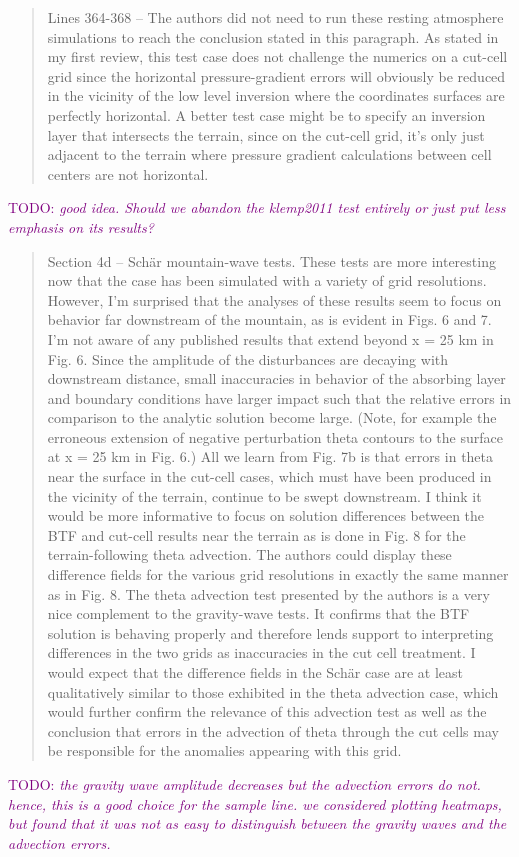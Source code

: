 \documentclass{article}
\newcommand{\TODO}[1]{\textcolor{purple}{TODO: \emph{#1}}}
\begin{document}
\begin{quotation}
 Lines 364-368 – The authors did not need to run these resting atmosphere 
 simulations to reach the conclusion stated in this paragraph. As stated in my first 
 review, this test case does not challenge the numerics on a cut-cell grid since the horizontal pressure-gradient errors will obviously be reduced in the vicinity of the 
 low level inversion where the coordinates surfaces are perfectly horizontal. A better 
 test case might be to specify an inversion layer that intersects the terrain, since on 
 the cut-cell grid, it's only just adjacent to the terrain where pressure gradient 
 calculations between cell centers are not horizontal.   
\end{quotation}
\TODO{good idea.  Should we abandon the klemp2011 test entirely or just put less emphasis on its results?}

\begin{quotation}
	Section 4d – Sch\"{a}r mountain-wave tests. These tests are more interesting now that 
 the case has been simulated with a variety of grid resolutions. However, I'm 
 surprised that the analyses of these results seem to focus on behavior far 
 downstream of the mountain, as is evident in Figs. 6 and 7. I'm not aware of any 
 published results that extend beyond x = 25 km in Fig. 6. Since the amplitude of the 
 disturbances are decaying with downstream distance, small inaccuracies in behavior 
 of the absorbing layer and boundary conditions have larger impact such that the 
 relative errors in comparison to the analytic solution become large. (Note, for 
 example the erroneous extension of negative perturbation theta contours to the 
 surface at x = 25 km in Fig. 6.)  All we learn from Fig. 7b is that errors in theta near 
 the surface in the cut-cell cases, which must have been produced in the vicinity of the 
 terrain, continue to be swept downstream. I think it would be more informative to 
 focus on solution differences between the BTF and cut-cell results near the terrain as 
 is done in Fig. 8 for the terrain-following theta advection. The authors could display 
 these difference fields for the various grid resolutions in exactly the same manner as 
 in Fig. 8. The theta advection test presented by the authors is a very nice complement 
 to the gravity-wave tests. It confirms that the BTF solution is behaving properly and 
 therefore lends support to interpreting differences in the two grids as inaccuracies in 
 the cut cell treatment. I would expect that the difference fields in the Sch\"{a}r case are 
 at least qualitatively similar to those exhibited in the theta advection case, which 
 would further confirm the relevance of this advection test as well as the conclusion 
 that errors in the advection of theta through the cut cells may be responsible for the 
 anomalies appearing with this grid.
\end{quotation}
\TODO{the gravity wave amplitude decreases but the advection errors do not.  hence, this is a good choice for the sample line.  we considered plotting heatmaps, but found that it was not as easy to distinguish between the gravity waves and the advection errors.}
\end{document}
